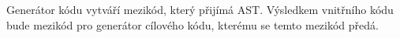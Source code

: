 \documentclass[../main.tex]{subfiles}
\begin{document}
Generátor kódu vytváří mezikód, který přijímá AST. Výsledkem vnitřního kódu bude mezikód pro generátor cílového kódu, kterému se temto mezikód předá.
\end{document}
